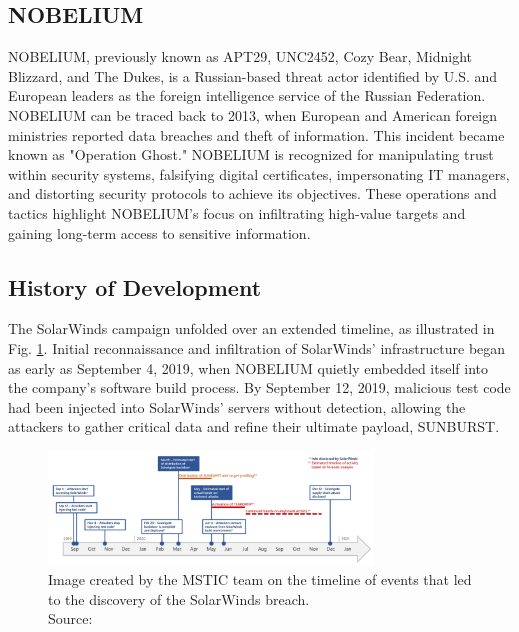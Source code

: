 \documentclass[conference]{IEEEtran}
\begin{document}
\subsection{NOBELIUM}
NOBELIUM, previously known as APT29, UNC2452, Cozy Bear, Midnight Blizzard, and The Dukes, is a Russian-based threat actor 
identified by U.S. and European leaders as the foreign intelligence service of the Russian Federation\cite{Microdoft2024NOBELIUM}.
 NOBELIUM can be traced back to 2013, when European and American foreign ministries reported data breaches and theft of information. 
 This incident became known as "Operation Ghost."\cite{MITREFirstNOBELIUMAttack} NOBELIUM is recognized for manipulating trust within 
 security systems, falsifying digital certificates, impersonating IT managers, and distorting security protocols to achieve its objectives.
  These operations and tactics highlight NOBELIUM's focus on infiltrating high-value targets and gaining long-term access to sensitive information.

\subsection{History of Development}
The SolarWinds campaign unfolded over an extended timeline, as illustrated in Fig. \ref{fig:Timeline-of-Solorigate-attacks}. Initial 
reconnaissance and infiltration of SolarWinds’ infrastructure began as early as September 4, 2019, when NOBELIUM quietly embedded itself 
into the company’s software build process. By September 12, 2019, malicious test code had been injected into SolarWinds’ servers without
 detection, allowing the attackers to gather critical data and refine their ultimate payload, SUNBURST.\cite{MicrosoftDeepDiveSOLORIGATE}
\begin{figure}[H]
    \centering
    \includegraphics[width=3.4in]{Timeline-of-Solorigate-attacks.png}
    \caption{Image created by the MSTIC team on the timeline of events that led to the discovery of the SolarWinds
    breach.\\Source: \cite{MicrosoftDeepDiveSOLORIGATE} }
    \label{fig:Timeline-of-Solorigate-attacks}
\end{figure}
\end{document}
